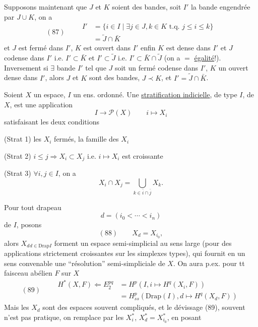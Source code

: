 Supposons maintenant que $J$ et $K$ soient des bandes,  soit $I'$ la bande engendrée par $J\cup K$, on a
\[
(87)\qquad\begin{aligned}
I'&=\{i\in I\mid\exists j\in J,k\in K\text{ t.q. }j\leq i\leq k\}\\
&=\widetilde J\cap\bar K
\end{aligned}
\]
et $J$ est fermé dans $I'$, $K$ est ouvert dans $I'$ enfin  $K$ est dense dans $I'$ et $J$ codense dans $I'$ i.e. $I'\subset\bar K$ et $I'\subset\widetilde J$  i.e. $I'\subset\bar K\cap\widetilde J$ (on a $=$ \uline{égalité}!). Inversement si $\exists$ bande $I'$ tel que $J$ soit un fermé codense dans $I'$, $K$ un ouvert dense dans $I'$, alors $J$ et $K$ sont des bandes, $J\prec K$, et  $I'=\widetilde J\cap\bar K$.

Soient $X$ un espace, $I$ un ens. ordonné.
Une \uline{stratification indicielle}, de type $I$, de $X$, est une application
\[I\longrightarrow\mathcal P(X)\qquad i\longmapsto X_i\]
satisfaisant les deux conditions

(Strat 1) les $X_i$ fermés, la famille des $X_i$  \uline{ }

(Strat 2) $i\leq j\Longrightarrow X_i\subset X_j$ i.e. $i\mapsto X_i$ est croissante

(Strat 3) $\forall i,j\in I$, on a
\[X_i\cap X_j=\bigcup_{k\in\bar i\cap\bar j}X_k.\]

Pour tout drapeau
\[d=(i_0<\cdots<i_n)\]
de $I$, posons
\[(88)\qquad X_d=X_{i_0},\]
alors  $X_d{}_{d\in\mathrm{Drap}I}$ forment un  espace semi-simplicial  au sens large (pour des applications strictement croissantes sur les simplexes types), qui fournit en un sens convenable une ``résolution'' semi-simpliciale de $X$. On aura p.ex. pour tt faisceau abélien $F$ sur $X$
\[
(89)\qquad\begin{aligned}
H^*(X,F)\Longleftarrow E_2^{pq}&=H^p(I,i\mapsto H^q(X_i,F))\\
&=H^p_{ss}(\mathrm{Drap}(I),d\mapsto H^q(X_d,F))
\end{aligned}
\]
Mais les  $X_d$ sont des espaces souvent compliqués, et le dévissage (89), souvent n'est pas pratique, on remplace par les $X_i^*$, $X_d^*=X_{i_0}^*$, en posant

